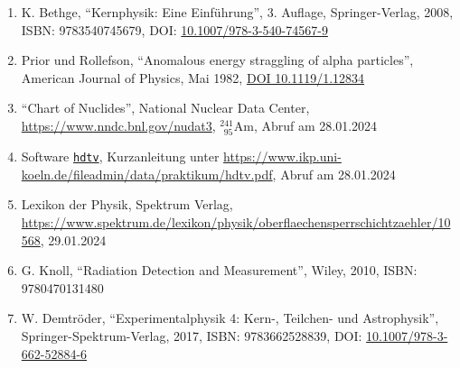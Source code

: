 \documentclass[12pt,a4paper]{scrartcl}
\numberwithin{equation}{section} %
\renewcommand{\[}{} %
\renewcommand{\]}{\noindent} %
\newcommand{\tightlist}{} %
\begin{document}
\begin{enumerate}
\def\labelenumi{\arabic{enumi}.}
\tightlist
\item
  K. Bethge, ``Kernphysik: Eine Einführung'', 3. Auflage,
  Springer-Verlag, 2008, ISBN: 9783540745679, DOI:
  \href{https://doi.org/10.1007/978-3-540-74567-9}{10.1007/978-3-540-74567-9}
\item
  Prior und Rollefson, ``Anomalous energy straggling of alpha
  particles'', American Journal of Physics, Mai 1982,
  \href{https://doi.org/10.1119/1.12834}{DOI 10.1119/1.12834}
\item
  ``Chart of Nuclides'', National Nuclear Data Center,
  \url{https://www.nndc.bnl.gov/nudat3}, \(^{241}_{\ \ 95}\mathrm{Am}\),
  Abruf am 28.01.2024
\item
  Software \href{https://pypi.org/project/hdtv}{\texttt{hdtv}},
  Kurzanleitung unter
  \url{https://www.ikp.uni-koeln.de/fileadmin/data/praktikum/hdtv.pdf},
  Abruf am 28.01.2024
\item
  Lexikon der Physik, Spektrum Verlag,
  \url{https://www.spektrum.de/lexikon/physik/oberflaechensperrschichtzaehler/10568},
  29.01.2024
\item
  G. Knoll, ``Radiation Detection and Measurement'', Wiley, 2010, ISBN:
  9780470131480
\item
  W. Demtröder, ``Experimentalphysik 4: Kern-, Teilchen- und
  Astrophysik'', Springer-Spektrum-Verlag, 2017, ISBN: 9783662528839,
  DOI:
  \href{https://doi.org/10.1007/978-3-662-52884-6}{10.1007/978-3-662-52884-6}
\end{enumerate}
\end{document}
